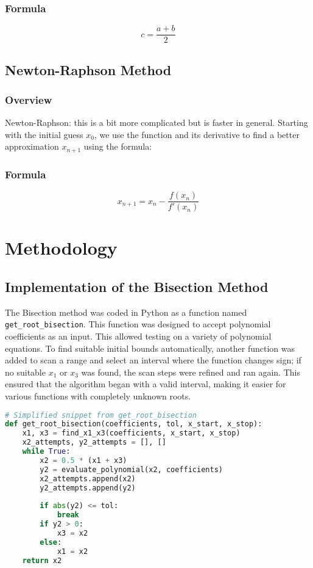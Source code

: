 \documentclass{llncs}
\numberwithin{figure}{section}
\begin{document}
\subsubsection{Formula}
\begin{equation}
c = \frac{a+b}{2}
\end{equation}
\vspace{3em}
\subsection{Newton-Raphson Method}
\vspace{1em}
\subsubsection{Overview}
Newton-Raphson: this is a bit more complicated but is faster in general. Starting with the initial guess \(x_0\), we use the function and its derivative to find a better approximation \(x_{n+1}\) using the formula:
\subsubsection{Formula}
\begin{equation}
x_{n+1} = x_n - \frac{f(x_n)}{f'(x_n)}
\end{equation}
\newpage
\section{Methodology}
\subsection{Implementation of the Bisection Method}
The Bisection method was coded in Python as a function named \texttt{get\_root\_bisection}. This function was designed to accept polynomial coefficients as an input. This allowed testing on a variety of polynomial equations. To find suitable initial bounds automatically, another function was added to scan a range and select an interval where the function changes sign; if no suitable $x_1$ or $x_3$ was found, the scan steps were refined and ran again. This ensured that the algorithm began with a valid interval, making it easier for various functions with completely unknown roots.
\vspace{1em}
\begin{lstlisting}[language=Python]
# Simplified snippet from get_root_bisection
def get_root_bisection(coefficients, tol, x_start, x_stop):
    x1, x3 = find_x1_x3(coefficients, x_start, x_stop)
    x2_attempts, y2_attempts = [], []
    while True:
        x2 = 0.5 * (x1 + x3)
        y2 = evaluate_polynomial(x2, coefficients)
        x2_attempts.append(x2)
        y2_attempts.append(y2)
        
        if abs(y2) <= tol:
            break
        if y2 > 0:
            x3 = x2
        else:
            x1 = x2
	return x2
\end{lstlisting}
\vspace{2em}
\end{document}
